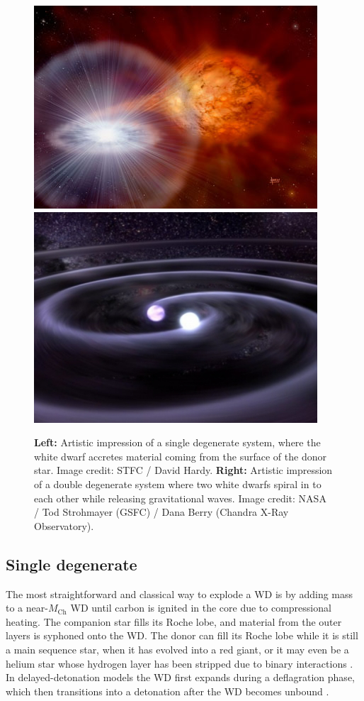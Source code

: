 \documentclass[a4paper,oneside,12pt, class=Latex/Classes/PhDthesisPSnPDF, crop=false]{standalone}
\begin{document}
\begin{figure}
    \centering
    \includegraphics[height=0.229\textheight]{../Images/chapter_1/single_deg.jpeg}
    \includegraphics[height=0.229\textheight]{../Images/chapter_1/double_deg.jpeg}
    \caption{\textbf{Left:} Artistic impression of a single degenerate system, where the white dwarf accretes material coming from the surface of the donor star. Image credit: STFC / David Hardy. \textbf{Right:} Artistic impression of a double degenerate system where two white dwarfs spiral in to each other while releasing gravitational waves. Image credit: NASA / Tod Strohmayer (GSFC) / Dana Berry (Chandra X-Ray Observatory).}
    \label{single_double_deg_mods}
\end{figure}


\subsection{Single degenerate}
The most straightforward and classical way to explode a WD is by adding mass to a near-$M_\text{Ch}$ WD until carbon is ignited in the core due to compressional heating. The companion star fills its Roche lobe, and material from the outer layers is syphoned onto the WD. The donor can fill its Roche lobe while it is still a main sequence star, when it has evolved into a red giant, or it may even be a helium star whose hydrogen layer has been stripped due to binary interactions \citep{Whelan_classical_Ia_mod, Nomoto_single_degenerate}. In delayed-detonation models the WD first expands during a deflagration phase, which then transitions into a detonation after the WD becomes unbound \citep{Kholov_Del_det, Mazzali_common_mechanism}.
\end{document}
